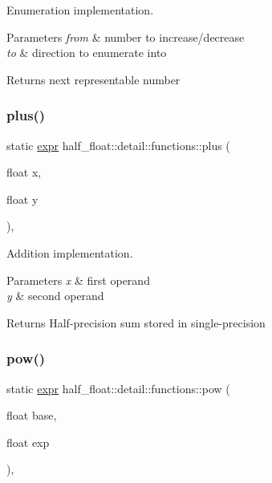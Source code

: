 Enumeration implementation. 
\begin{DoxyParams}{Parameters}
{\em from} & number to increase/decrease \\
\hline
{\em to} & direction to enumerate into \\
\hline
\end{DoxyParams}
\begin{DoxyReturn}{Returns}
next representable number 
\end{DoxyReturn}
\mbox{\label{structhalf__float_1_1detail_1_1functions_a00e552f89df586b355b7aaa3668bdfa1}} 
\subsubsection{\texorpdfstring{plus()}{plus()}}
{\footnotesize\ttfamily static \hyperlink{structhalf__float_1_1detail_1_1expr}{expr} half\+\_\+float\+::detail\+::functions\+::plus (\begin{DoxyParamCaption}\item[{float}]{x,  }\item[{float}]{y }\end{DoxyParamCaption})\hspace{0.3cm}{\ttfamily [inline]}, {\ttfamily [static]}}

Addition implementation. 
\begin{DoxyParams}{Parameters}
{\em x} & first operand \\
\hline
{\em y} & second operand \\
\hline
\end{DoxyParams}
\begin{DoxyReturn}{Returns}
Half-\/precision sum stored in single-\/precision 
\end{DoxyReturn}
\mbox{\label{structhalf__float_1_1detail_1_1functions_ad5ed7e96d8e10cef742e385262e311b3}} 
\subsubsection{\texorpdfstring{pow()}{pow()}}
{\footnotesize\ttfamily static \hyperlink{structhalf__float_1_1detail_1_1expr}{expr} half\+\_\+float\+::detail\+::functions\+::pow (\begin{DoxyParamCaption}\item[{float}]{base,  }\item[{float}]{exp }\end{DoxyParamCaption})\hspace{0.3cm}{\ttfamily [inline]}, {\ttfamily [static]}}

